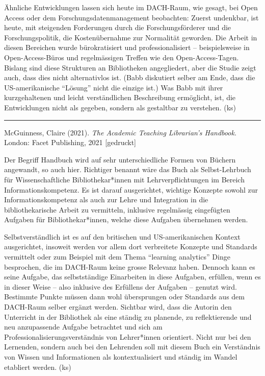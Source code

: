 \documentclass[a4paper,
fontsize=11pt,
oneside,
numbers=noperiodatend,
parskip=half-,
bibliography=totoc,
final
]{scrartcl}
\begin{document}
Ähnliche Entwicklungen lassen sich heute im DACH-Raum, wie gesagt, bei
Open Access oder dem Forschungsdatenmanagement beobachten: Zuerst
undenkbar, ist heute, mit steigenden Forderungen durch die
Forschungsförderer und die Forschungspolitik, die Kostenübernahme zur
Normalität geworden. Die Arbeit in diesen Bereichen wurde bürokratisiert
und professionalisiert -- beispielsweise in Open-Access-Büros und
regelmässigen Treffen wie den Open-Access-Tagen. Bislang sind diese
Strukturen an Bibliotheken angegliedert, aber die Studie zeigt auch,
dass dies nicht alternativlos ist. (Babb diskutiert selber am Ende, dass
die US-amerikanische \enquote{Lösung} nicht die einzige ist.) Was Babb
mit ihrer kurzgehaltenen und leicht verständlichen Beschreibung
ermöglicht, ist, die Entwicklungen nicht als gegeben, sondern als
gestaltbar zu verstehen. (ks)

\begin{center}\rule{0.5\linewidth}{0.5pt}\end{center}

McGuinness, Claire (2021). \emph{The Academic Teaching Librarian's
Handbook}. London: Facet Publishing, 2021 {[}gedruckt{]}

Der Begriff Handbuch wird auf sehr unterschiedliche Formen von Büchern
angewandt, so auch hier. Richtiger benannt wäre das Buch als
Selbst-Lehrbuch für Wissenschaftliche Bibliothekar\-*innen mit
Lehrverpflichtungen im Bereich Informationskompetenz. Es ist darauf
ausgerichtet, wichtige Konzepte sowohl zur Informationskompetenz als
auch zur Lehre und Integration in die bibliothekarische Arbeit zu
vermitteln, inklusive regelmässig eingefügten Aufgaben für
Bibliothekar*innen, welche diese Aufgaben übernehmen werden.

Selbstverständlich ist es auf den britischen und US-amerikanischen
Kontext ausgerichtet, insoweit werden vor allem dort verbreitete
Konzepte und Standards vermittelt oder zum Beispiel mit dem Thema
\enquote{learning analytics} Dinge besprochen, die im DACH-Raum keine
grosse Relevanz haben. Dennoch kann es seine Aufgabe, das selbstständige
Einarbeiten in diese Aufgaben, erfüllen, wenn es in dieser Weise -- also
inklusive des Erfüllens der Aufgaben -- genutzt wird. Bestimmte Punkte
müssen dann wohl übersprungen oder Standards aus dem DACH-Raum selber
ergänzt werden. Sichtbar wird, dass die Autorin den Unterricht in der
Bibliothek als eine ständig zu planende, zu reflektierende und neu
anzupassende Aufgabe betrachtet und sich am
Professionalisierungsverständnis von Lehrer*innen orientiert. Nicht nur
bei den Lernenden, sondern auch bei den Lehrenden soll mit diesem Buch
ein Verständnis von Wissen und Informationen als kontextualisiert und
ständig im Wandel etabliert werden. (ks)
\end{document}
